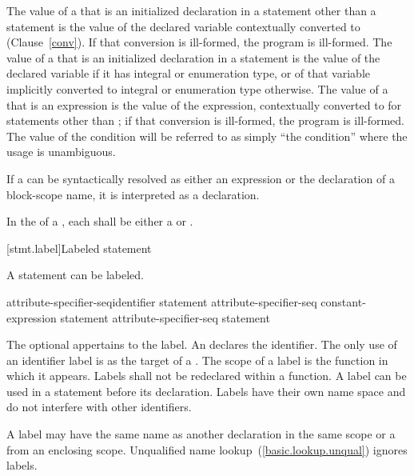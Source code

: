 \pnum
The value of a  that is an initialized declaration
in a statement other than a  statement is the value of the
declared variable
contextually converted to  (Clause~\ref{conv}).
If that
conversion is ill-formed, the program is ill-formed. The value of a
 that is an initialized declaration in a
 statement is the value of the declared variable if it has
integral or enumeration type, or of that variable implicitly converted
to integral or enumeration type otherwise. The value of a
 that is an expression is the value of the
expression, contextually converted to 
for statements other
than ;
if that conversion is ill-formed, the program is
ill-formed. The value of the condition will be referred to as simply
``the condition'' where the usage is unambiguous.

\pnum
If a  can be syntactically resolved as either an
expression or the declaration of a block-scope name, it is interpreted as a
declaration.

\pnum
In the  of a , each
 shall be either a 
or .

[stmt.label]{Labeled statement}%

\pnum
{}%
%
A statement can be labeled.

\begin{bnf}
\br
    attribute-specifier-seq\opt identifier \terminal{:} statement\br
    attribute-specifier-seq\opt{}  constant-expression \terminal{:} statement\br
    attribute-specifier-seq\opt{}  statement
\end{bnf}

The optional  appertains to the label. An
 declares the identifier. The only use of an
identifier label is as the target of a
%
.
%
The scope of a label is the function in which it appears. Labels shall
not be redeclared within a function. A label can be used in a
 statement before its declaration.
%
Labels have their own name space and do not interfere with other
identifiers.
\begin{note}
A label may have the same name as another declaration in the same scope or a
 from an enclosing scope. Unqualified name
lookup~(\ref{basic.lookup.unqual}) ignores labels.
\end{note}

